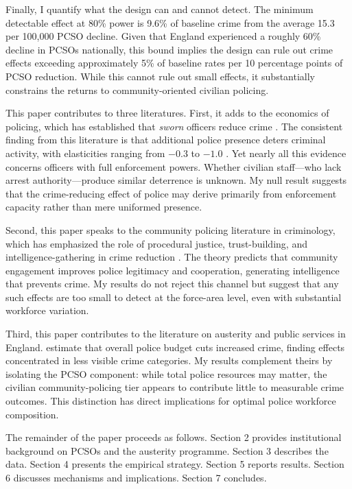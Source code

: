 \documentclass[12pt]{article}
\begin{document}
Finally, I quantify what the design can and cannot detect. The minimum detectable effect at 80\% power is 9.6\% of baseline crime from the average 15.3 per 100,000 PCSO decline. Given that England experienced a roughly 60\% decline in PCSOs nationally, this bound implies the design can rule out crime effects exceeding approximately 5\% of baseline rates per 10 percentage points of PCSO reduction. While this cannot rule out small effects, it substantially constrains the returns to community-oriented civilian policing.

This paper contributes to three literatures. First, it adds to the economics of policing, which has established that \textit{sworn} officers reduce crime \citep{levitt1997using, chalfin2018certainty, mello2019more, draca2011panic, klick2005using}. The consistent finding from this literature is that additional police presence deters criminal activity, with elasticities ranging from $-0.3$ to $-1.0$ \citep{chalfin2022police}. Yet nearly all this evidence concerns officers with full enforcement powers. Whether civilian staff---who lack arrest authority---produce similar deterrence is unknown. My null result suggests that the crime-reducing effect of police may derive primarily from enforcement capacity rather than mere uniformed presence.

Second, this paper speaks to the community policing literature in criminology, which has emphasized the role of procedural justice, trust-building, and intelligence-gathering in crime reduction \citep{tyler2004enhancing, bradford2014policing, sampson1997neighborhoods}. The theory predicts that community engagement improves police legitimacy and cooperation, generating intelligence that prevents crime. My results do not reject this channel but suggest that any such effects are too small to detect at the force-area level, even with substantial workforce variation.

Third, this paper contributes to the literature on austerity and public services in England. \citet{deste2024cuts} estimate that overall police budget cuts increased crime, finding effects concentrated in less visible crime categories. My results complement theirs by isolating the PCSO component: while total police resources may matter, the civilian community-policing tier appears to contribute little to measurable crime outcomes. This distinction has direct implications for optimal police workforce composition.

The remainder of the paper proceeds as follows. Section 2 provides institutional background on PCSOs and the austerity programme. Section 3 describes the data. Section 4 presents the empirical strategy. Section 5 reports results. Section 6 discusses mechanisms and implications. Section 7 concludes.
\end{document}
